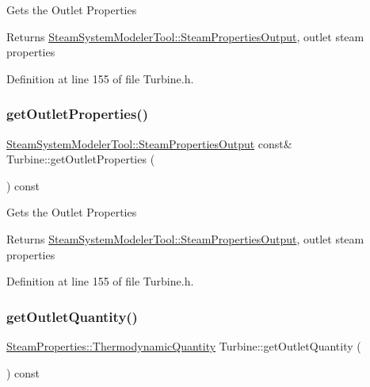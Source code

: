 Gets the Outlet Properties

\begin{DoxyReturn}{Returns}
\hyperlink{struct_steam_system_modeler_tool_1_1_steam_properties_output}{Steam\+System\+Modeler\+Tool\+::\+Steam\+Properties\+Output}, outlet steam properties 
\end{DoxyReturn}


Definition at line 155 of file Turbine.\+h.

\mbox{\label{class_turbine_aa9449622449e78285a258823ff77c8ec}} 
\subsubsection{\texorpdfstring{get\+Outlet\+Properties()}{getOutletProperties()}\hspace{0.1cm}{\footnotesize\ttfamily [3/3]}}
{\footnotesize\ttfamily \hyperlink{struct_steam_system_modeler_tool_1_1_steam_properties_output}{Steam\+System\+Modeler\+Tool\+::\+Steam\+Properties\+Output} const\& Turbine\+::get\+Outlet\+Properties (\begin{DoxyParamCaption}{ }\end{DoxyParamCaption}) const\hspace{0.3cm}{\ttfamily [inline]}}

Gets the Outlet Properties

\begin{DoxyReturn}{Returns}
\hyperlink{struct_steam_system_modeler_tool_1_1_steam_properties_output}{Steam\+System\+Modeler\+Tool\+::\+Steam\+Properties\+Output}, outlet steam properties 
\end{DoxyReturn}


Definition at line 155 of file Turbine.\+h.

\mbox{\label{class_turbine_acd3e98ab67754b652de97498d9bec6d2}} 
\subsubsection{\texorpdfstring{get\+Outlet\+Quantity()}{getOutletQuantity()}\hspace{0.1cm}{\footnotesize\ttfamily [1/3]}}
{\footnotesize\ttfamily \hyperlink{class_steam_properties_ae0294bedf7d178c2d8fb6aed0f62fbff}{Steam\+Properties\+::\+Thermodynamic\+Quantity} Turbine\+::get\+Outlet\+Quantity (\begin{DoxyParamCaption}{ }\end{DoxyParamCaption}) const\hspace{0.3cm}{\ttfamily [inline]}}

